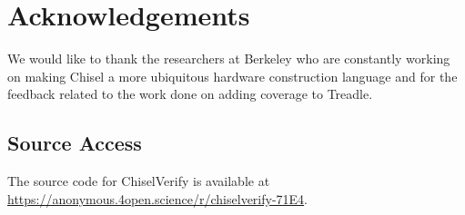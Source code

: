 \documentclass[conference]{IEEEtran}
\newcommand{\todo}[1]{{\color{olive} TODO: #1}}
\newcommand{\martin}[1]{{\color{blue} Martin: #1}}
\newcommand{\hjd}[1]{{\color{pink} Hans: #1}}
\begin{document}
\section*{Acknowledgements}
We would like to thank the researchers at Berkeley who are constantly working on making Chisel a more ubiquitous hardware construction language and for the feedback related to the work done on adding coverage to Treadle.

\subsection*{Source Access}
The source code for ChiselVerify is available at\\ \url{https://anonymous.4open.science/r/chiselverify-71E4}.



\end{document}

